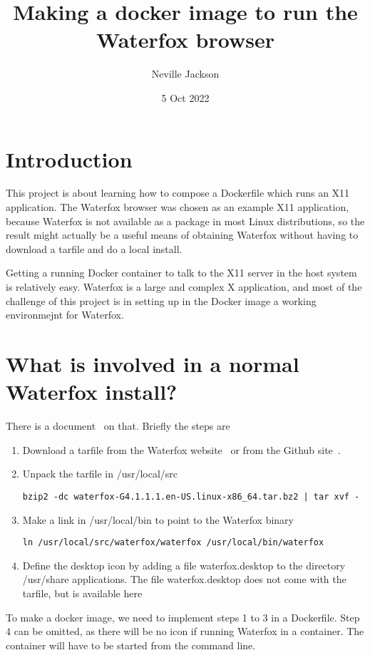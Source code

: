 \documentclass[a4paper]{article}  %
\title{Making a docker image to run the Waterfox browser}
\author{Neville Jackson}
\date{5 Oct 2022}
\begin{document}
 

\maketitle      
\tableofcontents

\section{Introduction} 
This project is about learning how to compose a Dockerfile which runs an X11 application. The Waterfox browser was chosen as an example X11 application, because Waterfox is not available as a package in most Linux distributions, so the result might actually be a useful means of obtaining Waterfox without having to download a tarfile and do a local install. 

Getting a running Docker container to talk to the X11 server in the host system is relatively easy. Waterfox is a large and complex X application, and most of the challenge of this project is in setting up in the Docker image a working environmejnt for Waterfox. 

\section{What is involved in a normal Waterfox install?}
There is a document~\cite{wate:22a} on that.  Briefly the steps are
\begin{enumerate}
\item Download a tarfile from the Waterfox website~\cite{wate:22} or from the Github site~\cite{wate:22b}.
\item  Unpack the tarfile in /usr/local/src
\begin{tcolorbox}
\begin{verbatim}
bzip2 -dc waterfox-G4.1.1.1.en-US.linux-x86_64.tar.bz2 | tar xvf -
\end{verbatim}
\end{tcolorbox}
\item Make a link in /usr/local/bin to point to the Waterfox binary
\begin{tcolorbox}
\begin{verbatim}
ln /usr/local/src/waterfox/waterfox /usr/local/bin/waterfox
\end{verbatim}
\end{tcolorbox}
\item Define the desktop icon by adding a file waterfox.desktop to the directory /usr/share applications. The file waterfox.desktop does not come with the tarfile, but is available here~\cite{wate:22a}
\end{enumerate}
To make a docker image, we need to implement steps 1 to 3 in a Dockerfile. Step 4 can be omitted, as there will be no icon if running Waterfox in a container. The container will have to be started from the command line.
\end{document}
